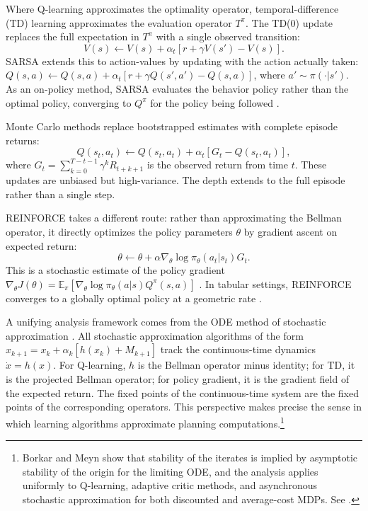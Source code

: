 Where Q-learning approximates the optimality operator, temporal-difference (TD) learning \citep{sutton1988} approximates the evaluation operator $T^\pi$. The TD(0) update replaces the full expectation in $T^\pi$ with a single observed transition:
\begin{equation}
V(s) \leftarrow V(s) + \alpha_t \left[ r + \gamma V(s') - V(s) \right].
\end{equation}
SARSA extends this to action-values by updating with the action actually taken: $Q(s,a) \leftarrow Q(s,a) + \alpha_t [r + \gamma Q(s',a') - Q(s,a)]$, where $a' \sim \pi(\cdot|s')$. As an on-policy method, SARSA evaluates the behavior policy rather than the optimal policy, converging to $Q^\pi$ for the policy being followed \citep{singh2000}.

Monte Carlo methods replace bootstrapped estimates with complete episode returns:
\begin{equation}
Q(s_t,a_t) \leftarrow Q(s_t,a_t) + \alpha_t \left[ G_t - Q(s_t,a_t) \right],
\end{equation}
where $G_t = \sum_{k=0}^{T-t-1} \gamma^k R_{t+k+1}$ is the observed return from time $t$. These updates are unbiased but high-variance. The depth extends to the full episode rather than a single step.

REINFORCE \citep{williams1992_reinforce} takes a different route: rather than approximating the Bellman operator, it directly optimizes the policy parameters $\theta$ by gradient ascent on expected return:
\begin{equation}
\theta \leftarrow \theta + \alpha \nabla_\theta \log \pi_\theta(a_t|s_t) G_t.
\end{equation}
This is a stochastic estimate of the policy gradient $\nabla_\theta J(\theta) = \mathbb{E}_\pi [\nabla_\theta \log \pi_\theta(a|s) Q^\pi(s,a)]$ \citep{SuttonMcAllester2000}. In tabular settings, REINFORCE converges to a globally optimal policy at a geometric rate \citep{agarwal2021theory}.

A unifying analysis framework comes from the ODE method of stochastic approximation \citep{borkar2000}. All stochastic approximation algorithms of the form $x_{k+1} = x_k + \alpha_k [h(x_k) + M_{k+1}]$ track the continuous-time dynamics $\dot{x} = h(x)$. For Q-learning, $h$ is the Bellman operator minus identity; for TD, it is the projected Bellman operator; for policy gradient, it is the gradient field of the expected return. The fixed points of the continuous-time system are the fixed points of the corresponding operators. This perspective makes precise the sense in which learning algorithms approximate planning computations.\footnote{Borkar and Meyn show that stability of the iterates is implied by asymptotic stability of the origin for the limiting ODE, and the analysis applies uniformly to Q-learning, adaptive critic methods, and asynchronous stochastic approximation for both discounted and average-cost MDPs. See \citet{borkar2000}.}

